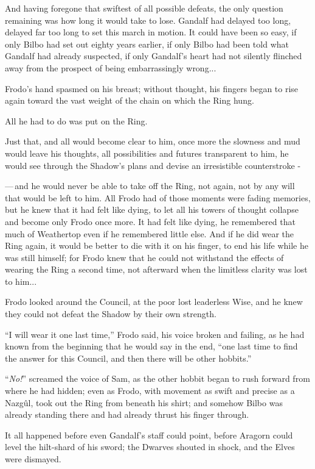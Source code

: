 And having foregone that swiftest of all possible defeats, the only question remaining was how long it would take to lose. Gandalf had delayed too long, delayed far too long to set this march in motion. It could have been so easy, if only Bilbo had set out eighty years earlier, if only Bilbo had been told what Gandalf had already suspected, if only Gandalf's heart had not silently flinched away from the prospect of being embarrassingly wrong...

Frodo's hand spasmed on his breast; without thought, his fingers began to rise again toward the vast weight of the chain on which the Ring hung.

All he had to do was put on the Ring.

Just that, and all would become clear to him, once more the slowness and mud would leave his thoughts, all possibilities and futures transparent to him, he would see through the Shadow's plans and devise an irresistible counterstroke -

---\,and he would never be able to take off the Ring, not again, not by any will that would be left to him. All Frodo had of those moments were fading memories, but he knew that it had felt like dying, to let all his towers of thought collapse and become only Frodo once more. It had felt like dying, he remembered that much of Weathertop even if he remembered little else. And if he did wear the Ring again, it would be better to die with it on his finger, to end his life while he was still himself; for Frodo knew that he could not withstand the effects of wearing the Ring a second time, not afterward when the limitless clarity was lost to him...

Frodo looked around the Council, at the poor lost leaderless Wise, and he knew they could not defeat the Shadow by their own strength.

``I will wear it one last time,'' Frodo said, his voice broken and failing, as he had known from the beginning that he would say in the end, ``one last time to find the answer for this Council, and then there will be other hobbits.''

``\emph{No!}'' screamed the voice of Sam, as the other hobbit began to rush forward from where he had hidden; even as Frodo, with movement as swift and precise as a Nazgûl, took out the Ring from beneath his shirt; and somehow Bilbo was already standing there and had already thrust his finger through.

It all happened before even Gandalf's staff could point, before Aragorn could level the hilt-shard of his sword; the Dwarves shouted in shock, and the Elves were dismayed.

